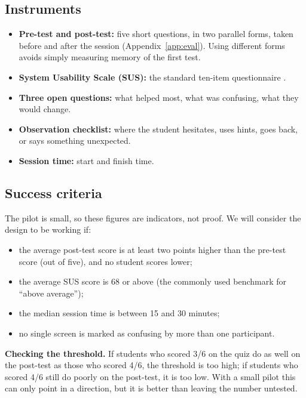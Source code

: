 \documentclass[11pt,a4paper]{article}
\begin{document}
\subsection{Instruments}

\begin{itemize}
  \item \textbf{Pre-test and post-test:} five short questions, in two parallel forms, taken before
        and after the session (Appendix~\ref{app:eval}). Using different forms avoids simply
        measuring memory of the first test.
  \item \textbf{System Usability Scale (SUS):} the standard ten-item questionnaire \cite{brooke1996}.
  \item \textbf{Three open questions:} what helped most, what was confusing, what they would change.
  \item \textbf{Observation checklist:} where the student hesitates, uses hints, goes back, or
        says something unexpected.
  \item \textbf{Session time:} start and finish time.
\end{itemize}

\subsection{Success criteria}

The pilot is small, so these figures are indicators, not proof. We will consider the design to be
working if:

\begin{itemize}
  \item the average post-test score is at least two points higher than the pre-test score (out of
        five), and no student scores lower;
  \item the average SUS score is 68 or above (the commonly used benchmark for ``above average'');
  \item the median session time is between 15 and 30 minutes;
  \item no single screen is marked as confusing by more than one participant.
\end{itemize}

\textbf{Checking the threshold.} If students who scored 3/6 on the quiz do as well on the post-test
as those who scored 4/6, the threshold is too high; if students who scored 4/6 still do poorly on
the post-test, it is too low. With a small pilot this can only point in a direction, but it is
better than leaving the number untested.
\end{document}
